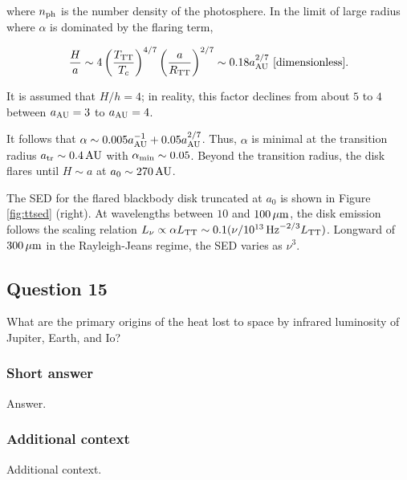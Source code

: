 \documentclass[a4paper,10pt]{article}
\begin{document}
{\noindent}where $n_{\rm ph}$ is the number density of the photosphere. In the limit of large radius where $\alpha$ is dominated by the flaring term,

\begin{align*}
    \frac{H}{a} \sim 4\left(\frac{T_{\rm TT}}{T_c}\right)^{4/7} \left(\frac{a}{R_{\rm TT}}\right)^{2/7} \sim 0.18a_{\rm AU}^{2/7} ~ [{\rm dimensionless}].
\end{align*}

{\noindent}It is assumed that $H/h=4$; in reality, this factor declines from about $5$ to $4$ between $a_{\rm AU}=3$ to $a_{\rm AU}=4$.

{\noindent}It follows that $\alpha\sim0.005a_{\rm AU}^{-1}+0.05a_{\rm AU}^{2/7}$. Thus, $\alpha$ is minimal at the transition radius $a_{\rm tr}\sim0.4\,{\rm AU}$ with $\alpha_{\rm min}\sim0.05$. Beyond the transition radius, the disk flares until $H\sim a$ at $a_0\sim270\,{\rm AU}$.

{\noindent}The SED for the flared blackbody disk truncated at $a_0$ is shown in Figure \ref{fig:ttsed} (right). At wavelengths between $10$ and $100\,\mu{\rm m}$, the disk emission follows the scaling relation $L_\nu\propto\alpha L_{\rm TT}\sim0.1(\nu/10^{13}\,{\rm Hz}^{-2/3}L_{\rm TT})$. Longward of $300\,\mu{\rm m}$ in the Rayleigh-Jeans regime, the SED varies as $\nu^3$.


\newpage
\subsection{Question 15}

What are the primary origins of the heat lost to space by infrared luminosity of Jupiter, Earth, and Io?

\subsubsection{Short answer}

Answer.

\subsubsection{Additional context}

Additional context.

\end{document}
